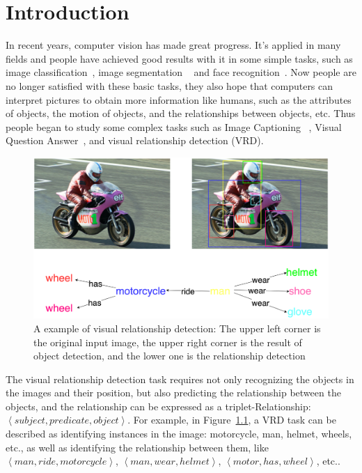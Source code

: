 \chapter{Introduction}
\label{chap:introduction}
\setcounter{page}{1}

In recent years, computer vision has made great progress. It's applied in many fields and people have achieved good results with it in some simple tasks, such as image classification~\cite{yu2017convolutional, lu2007survey}, image segmentation ~\cite{pham2000current} and face recognition~\cite{ahonen2006face, phillips1996feret}. Now people are no longer satisfied with these basic tasks, they also hope that computers can interpret pictures to obtain more information like humans, such as the attributes of objects,  the motion of objects, and the relationships between objects, etc. Thus people began to study some complex tasks such as Image Captioning ~\cite{hossain2019comprehensive},  Visual Question Answer~\cite{antol2015vqa}, and visual relationship detection (VRD). 

\begin{figure}[!htbp]
	\centering
	\includegraphics[width = 0.9 \textwidth]{figures/senen_graph.png}
	\caption[A example of visual relationship detection]
	{ A example of visual relationship detection: The upper left corner is the original input image, the upper right corner is the result of object detection, and the lower one is the relationship detection}
	\label{fig:sene}
\end{figure}

The visual relationship detection task requires not only recognizing the objects
in the images and their position, but also predicting the relationship between the 
objects, and the relationship can be expressed as a triplet-Relationship: $\left \langle subject, predicate, object\right \rangle$. For example, in Figure~\ref{fig:sene}, a VRD task can be described as identifying instances in the image: motorcycle, man, helmet, wheels, etc., as well as identifying the relationship between them, like $\left \langle man, ride, motorcycle\right \rangle$, $\left \langle man, wear, helmet\right \rangle$, $\left \langle motor, has, wheel\right \rangle$, etc..



